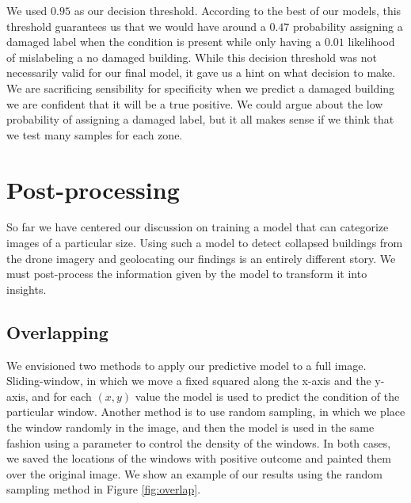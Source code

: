 We used $0.95$ as our decision threshold. According to the best of our models, this threshold guarantees us that we would have around a $0.47$ probability assigning a damaged label when the condition is present while only having a $0.01$ likelihood of mislabeling a no damaged building. While this decision threshold was not necessarily valid for our final model, it gave us a hint on what decision to make. We are sacrificing sensibility for specificity when we predict a damaged building we are confident that it will be a true positive. We could argue about the low probability of assigning a damaged label, but it all makes sense if we think that we test many samples for each zone.\\


\section{Post-processing}

So far we have centered our discussion on training a model that can categorize images of a particular size. Using such a model to detect collapsed buildings from the drone imagery and geolocating our findings is an entirely different story. We must post-process the information given by the model to transform it into insights.\\

\subsection{Overlapping}

We envisioned two methods to apply our predictive model to a full image. Sliding-window, in which we move a fixed squared along the x-axis and the y-axis, and for each $(x,y)$ value the model is used to predict the condition of the particular window. Another method is to use random sampling, in which we place the window randomly in the image, and then the model is used in the same fashion using a parameter to control the density of the windows. In both cases, we saved the locations of the windows with positive outcome and painted them over the original image. We show an example of our results using the random sampling method in Figure \ref{fig:overlap}.\\

